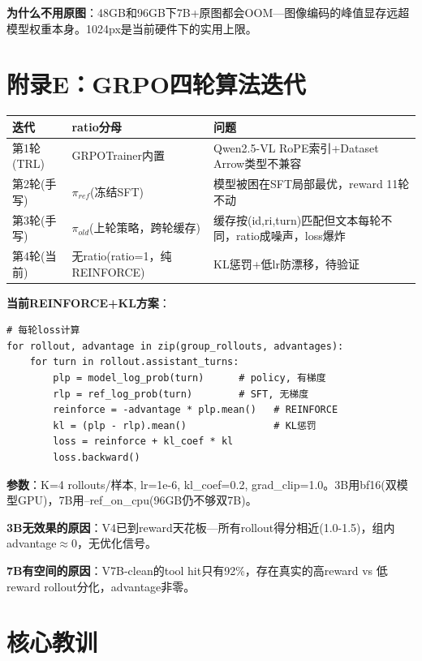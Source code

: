 \documentclass[fontset=none,11pt,a4paper]{ctexart}
\begin{document}
\textbf{为什么不用原图}：48GB和96GB下7B+原图都会OOM---图像编码的峰值显存远超模型权重本身。1024px是当前硬件下的实用上限。

\section{附录E：GRPO四轮算法迭代}

\begin{longtable}{lp{5cm}p{5cm}}
\toprule
迭代 & ratio分母 & 问题 \\
\midrule
第1轮(TRL) & GRPOTrainer内置 & Qwen2.5-VL RoPE索引+Dataset Arrow类型不兼容 \\
第2轮(手写) & $\pi_{ref}$(冻结SFT) & 模型被困在SFT局部最优，reward 11轮不动 \\
第3轮(手写) & $\pi_{old}$(上轮策略，跨轮缓存) & 缓存按(id,ri,turn)匹配但文本每轮不同，ratio成噪声，loss爆炸 \\
第4轮(当前) & 无ratio(ratio=1，纯REINFORCE) & KL惩罚+低lr防漂移，待验证 \\
\bottomrule
\end{longtable}

\textbf{当前REINFORCE+KL方案}：

\begin{lstlisting}
# 每轮loss计算
for rollout, advantage in zip(group_rollouts, advantages):
    for turn in rollout.assistant_turns:
        plp = model_log_prob(turn)      # policy, 有梯度
        rlp = ref_log_prob(turn)        # SFT, 无梯度
        reinforce = -advantage * plp.mean()   # REINFORCE
        kl = (plp - rlp).mean()               # KL惩罚
        loss = reinforce + kl_coef * kl
        loss.backward()
\end{lstlisting}

\textbf{参数}：K=4 rollouts/样本, lr=1e-6, kl\_coef=0.2, grad\_clip=1.0。3B用bf16(双模型GPU)，7B用--ref\_on\_cpu(96GB仍不够双7B)。

\textbf{3B无效果的原因}：V4已到reward天花板---所有rollout得分相近(1.0-1.5)，组内advantage$\approx$0，无优化信号。

\textbf{7B有空间的原因}：V7B-clean的tool hit只有92\%，存在真实的高reward vs 低reward rollout分化，advantage非零。

\section{核心教训}
\end{document}
